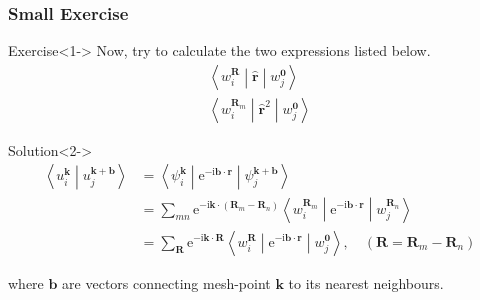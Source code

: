 \documentclass{beamer}
\begin{document}
  \begin{frame}
    \frametitle{Small Exercise}

    \begin{exampleblock}{Exercise}<1->
      \small
      Now, try to calculate the two expressions listed below.
      \begin{subequations}
        \begin{align}
          \left\langle{}w_i^{\mathbf{R}}\middle|\widehat{\mathbf{r}}\middle|{}w_j^{\mathbf{0}}\right\rangle\\
          \left\langle{}w_i^{\mathbf{R}_m}\middle|\widehat{\mathbf{r}}^2\middle|{}w_j^{\mathbf{0}}\right\rangle
        \end{align}
      \end{subequations}
    \end{exampleblock}
    
    \begin{block}{Solution}<2->
      \small
      \begin{equation*}
        \begin{aligned}
          \left\langle{}u_i^{\mathbf{k}}\middle|{}u_j^{\mathbf{k}+\mathbf{b}}\right\rangle &= \left\langle{}\psi_i^{\mathbf{k}}\middle|\mathrm{e}^{-\mathrm{i}\mathbf{b}\cdot\mathbf{r}}\middle|{}\psi_j^{\mathbf{k}+\mathbf{b}}\right\rangle\\
          &= \sum_{mn}\mathrm{e}^{-\mathrm{i}\mathbf{k}\cdot(\mathbf{R}_m-\mathbf{R}_n)}\left\langle{}w_i^{\mathbf{R}_m}\middle|\mathrm{e}^{-\mathrm{i}\mathbf{b}\cdot\mathbf{r}}\middle|{}w_j^{\mathbf{R}_n}\right\rangle\\
          &= \sum_{\mathbf{R}}\mathrm{e}^{-\mathrm{i}\mathbf{k}\cdot\mathbf{R}}\left\langle{}w_i^{\mathbf{R}}\middle|\mathrm{e}^{-\mathrm{i}\mathbf{b}\cdot\mathbf{r}}\middle|{}w_j^{\mathbf{0}}\right\rangle,\quad (\mathbf{R}=\mathbf{R}_m-\mathbf{R}_n)
        \end{aligned}
      \end{equation*}

      where \(\mathbf{b}\) are vectors connecting mesh-point \(\mathbf{k}\) to its nearest neighbours.

      \end{block}

    \end{frame}
\end{document}
